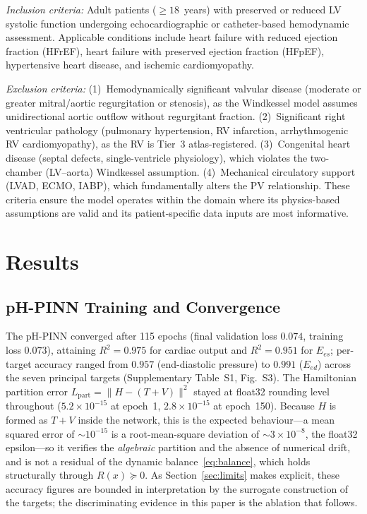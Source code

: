 \documentclass[journal]{IEEEtran}
\begin{document}
\emph{Inclusion criteria:} Adult patients ($\ge 18$~years) with preserved or reduced LV systolic function undergoing echocardiographic or catheter-based hemodynamic assessment. Applicable conditions include heart failure with reduced ejection fraction (HFrEF), heart failure with preserved ejection fraction (HFpEF), hypertensive heart disease, and ischemic cardiomyopathy.

\emph{Exclusion criteria:} (1)~Hemodynamically significant valvular disease (moderate or greater mitral/aortic regurgitation or stenosis), as the Windkessel model assumes unidirectional aortic outflow without regurgitant fraction. (2)~Significant right ventricular pathology (pulmonary hypertension, RV infarction, arrhythmogenic RV cardiomyopathy), as the RV is Tier~3 atlas-registered. (3)~Congenital heart disease (septal defects, single-ventricle physiology), which violates the two-chamber (LV--aorta) Windkessel assumption. (4)~Mechanical circulatory support (LVAD, ECMO, IABP), which fundamentally alters the PV relationship. These criteria ensure the model operates within the domain where its physics-based assumptions are valid and its patient-specific data inputs are most informative.

\section{Results}\label{sec:results}

\subsection{pH-PINN Training and Convergence}\label{sec:train}
The pH-PINN converged after 115 epochs (final validation loss $0.074$, training loss $0.073$), attaining $R^2=0.975$ for cardiac output and $R^2=0.951$ for $E_{es}$; per-target accuracy ranged from $0.957$ (end-diastolic pressure) to $0.991$ ($E_{ed}$) across the seven principal targets (Supplementary Table~S1, Fig.~S3). The Hamiltonian partition error $L_{\text{part}}=\lVert H-(T+V)\rVert^{2}$ stayed at float32 rounding level throughout ($5.2\times10^{-15}$ at epoch~1, $2.8\times10^{-15}$ at epoch~150). Because $H$ is formed as $T+V$ inside the network, this is the expected behaviour---a mean squared error of ${\sim}10^{-15}$ is a root-mean-square deviation of ${\sim}3\times10^{-8}$, the float32 epsilon---so it verifies the \emph{algebraic} partition and the absence of numerical drift, and is not a residual of the dynamic balance~\eqref{eq:balance}, which holds structurally through $R(x)\succeq0$. As Section~\ref{sec:limits} makes explicit, these accuracy figures are bounded in interpretation by the surrogate construction of the targets; the discriminating evidence in this paper is the ablation that follows.
\end{document}
